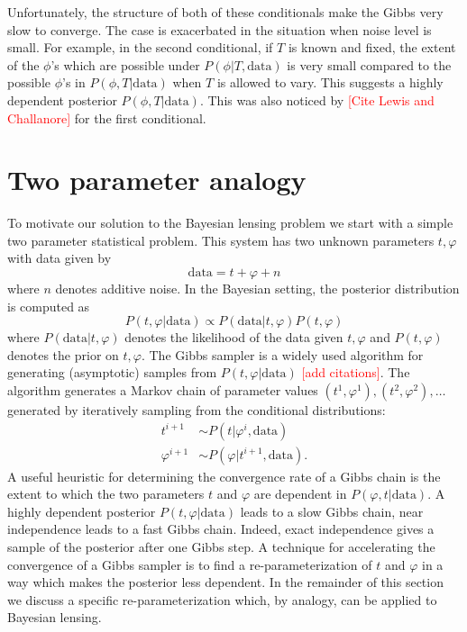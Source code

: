 \documentclass[noinfoline]{imsart}
\begin{document}
Unfortunately, the structure of both of these conditionals make the Gibbs very slow to converge. The case is exacerbated in the situation when noise level is small. For example, in the second conditional, if $T$ is known and fixed, the extent of the  $\phi$'s which are possible under $P(\phi|T,\text{data})$  is very small compared to the possible $\phi$'s  in $P(\phi, T| \text{data})$ when $T$ is allowed to vary. 
This suggests a highly dependent posterior $P(\phi, T| \text{data})$. 
This was also noticed by \textcolor{red}{[Cite Lewis and Challanore]} for the first conditional.









%
%
\section{Two parameter analogy}
\label{two parameter system}


To motivate our solution to the Bayesian lensing problem we start with a simple two parameter statistical problem.  This system has two unknown parameters $ t, \varphi$ with data given by
\[\text{data} =  t + \varphi + n\]
where $n$ denotes additive noise.  In the Bayesian setting, the posterior distribution is computed as 
\begin{equation}
\label{post1}
 P( t,\varphi|\text{data})\propto P(\text{data}| t, \varphi) P( t,\varphi) 
 \end{equation}
where $P(\text{data}| t, \varphi)$ denotes the likelihood of the data given  $ t, \varphi$ and $P( t,\varphi)$ denotes the  prior on $ t, \varphi$. 
The Gibbs sampler is a widely used algorithm for generating (asymptotic) samples from  $P( t, \varphi|\text{data})$ \textcolor{red}{[add citations]}. The algorithm generates a Markov chain of parameter values $( t^{1}, \varphi^{1}), ( t^{2}, \varphi^{2}),\ldots$ generated by iteratively sampling from the conditional distributions:
\begin{align*}
 t^{i+1} &\sim P( t|\varphi^{i},\text{data}) \\
\varphi^{i+1}   &\sim P(\varphi| t^{i+1},\text{data}).
\end{align*}
A useful heuristic for determining the convergence rate of a Gibbs chain is the extent to which the two parameters $ t$ and $\varphi$ are dependent in $P(\varphi,  t|\text{data})$. A highly dependent posterior $P( t, \varphi|\text{data})$ leads to a slow Gibbs chain, near independence leads to a fast Gibbs chain. Indeed, exact independence gives a sample of the posterior after one Gibbs step.  A technique for accelerating the convergence of a Gibbs sampler is to find a  re-parameterization of $ t$ and $\varphi$ in a way which makes the posterior less dependent. In the remainder of this section we discuss a specific re-parameterization which, by analogy, can be applied to Bayesian lensing.
\end{document}
